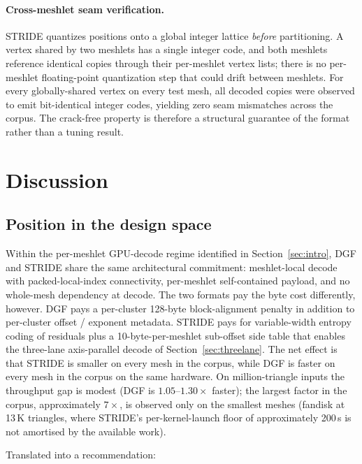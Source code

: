 \documentclass[pdflatex,sn-vancouver-num]{sn-jnl}%
\theoremstyle{thmstyleone}%
\theoremstyle{thmstyletwo}%
\theoremstyle{thmstylethree}%
\begin{document}
\paragraph{Cross-meshlet seam verification.}
STRIDE quantizes positions onto a global integer lattice \emph{before} partitioning. A vertex shared by two meshlets has a single integer code, and both meshlets reference identical copies through their per-meshlet vertex lists; there is no per-meshlet floating-point quantization step that could drift between meshlets. For every globally-shared vertex on every test mesh, all decoded copies were observed to emit bit-identical integer codes, yielding zero seam mismatches across the corpus. The crack-free property is therefore a structural guarantee of the format rather than a tuning result.

\section{Discussion}\label{sec:discussion}

\subsection{Position in the design space}

Within the per-meshlet GPU-decode regime identified in Section~\ref{sec:intro}, DGF and STRIDE share the same architectural commitment: meshlet-local decode with packed-local-index connectivity, per-meshlet self-contained payload, and no whole-mesh dependency at decode. The two formats pay the byte cost differently, however. DGF pays a per-cluster 128-byte block-alignment penalty in addition to per-cluster offset / exponent metadata. STRIDE pays for variable-width entropy coding of residuals plus a 10-byte-per-meshlet sub-offset side table that enables the three-lane axis-parallel decode of Section~\ref{sec:threelane}. The net effect is that STRIDE is smaller on every mesh in the corpus, while DGF is faster on every mesh in the corpus on the same hardware. On million-triangle inputs the throughput gap is modest (DGF is $1.05$--$1.30\times$ faster); the largest factor in the corpus, approximately $7\times$, is observed only on the smallest meshes (fandisk at 13\,K triangles, where STRIDE's per-kernel-launch floor of approximately 200\,\textmu s is not amortised by the available work).

Translated into a recommendation:
\end{document}
